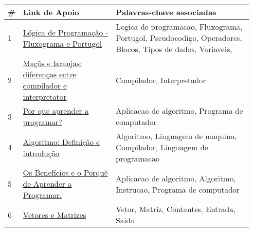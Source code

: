 \begin{longtable}{| p{} | p{} | p{} |}
\hline
\#  & Link de Apoio                                                                                                                                                                                                                & Palavras-chave associadas                                                                                                                                  \\ \hline
1   & \href{http://academicotech.blogspot.com.br/2014/02/v-behaviorurldefaultvmlo.html}{\color{blue} Lógica de Programação - Fluxograma e Portugol                                       } & Logica de programacao, Fluxograma, Portugol, Pseudocodigo, Operadores, Blocos, Tipos de dados, Variaveis,                                         \\ \hline
2   & \href{http://blog.academiadocodigo.com.br/2014/12/macas-e-laranjas-diferencas-entre-compilador-e-interpretator/}{\color{blue} Maçãs e laranjas: diferenças entre compilador e interpretator                       } & Compilador, Interpretador                                                                                                                         \\ \hline
3   & \href{http://blog.triadworks.com.br/por-que-aprender-a-programar}{\color{blue} Por que aprender a programar?                                                       } & Aplicacao de algoritmo, Programa de computador                                                                                                    \\ \hline
4   & \href{http://br.ccm.net/faq/9709-algoritmo-definicao-e-introducao}{\color{blue} Algoritmo: Definição e introdução                                                   } & Algoritmo, Linguagem de maquina, Compilador, Linguagem de programacao                                                                             \\ \hline
5   & \href{http://coral.ufsm.br/pet-si/index.php/os-beneficios-e-o-porque-de-aprender-a-programar/}{\color{blue} Os Benefícios e o Porquê de Aprender a Programar.                                   } & Aplicacao de algoritmo, Algoritmo, Instrucao, Programa de computador                                                                              \\ \hline
6   & \href{http://dcm.ffclrp.usp.br/~augusto/teaching/ici/Vetores-Matrizes.pdf}{\color{blue} Vetores e Matrizes                                                                  } & Vetor, Matriz, Contantes, Entrada, Saida                                                                                                          \\ \hline

\end{longtable}
